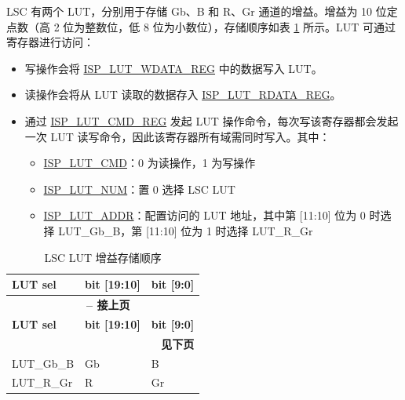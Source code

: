 \documentclass[main\_\_CN.tex]{subfiles}
\begin{document}
LSC 有两个 LUT，分别用于存储 Gb、B 和 R、Gr 通道的增益。增益为 10 位定点数（高 2 位为整数位，低 8 位为小数位），存储顺序如表 \ref{tab:lsc_lut_order} 所示。LUT 可通过寄存器进行访问：
\begin{itemize}
    \item 写操作会将 \hyperref[regdesc:ISPLUTWDATAREG]{ISP\_LUT\_WDATA\_REG} 中的数据写入 LUT。
    \item 读操作会将从 LUT 读取的数据存入 \hyperref[regdesc:ISPLUTRDATAREG]{ISP\_LUT\_RDATA\_REG}。
    \item 通过 \hyperref[regdesc:ISPLUTCMDREG]{ISP\_LUT\_CMD\_REG} 发起 LUT 操作命令，每次写该寄存器都会发起一次 LUT 读写命令，因此该寄存器所有域需同时写入。其中：\\
    \begin{itemize}
        \item \hyperref[fielddesc:ISPLUTCMD]{ISP\_LUT\_CMD}：0 为读操作，1 为写操作\\
        \item \hyperref[fielddesc:ISPLUTNUM]{ISP\_LUT\_NUM}：置 0 选择 LSC LUT\\
        \item \hyperref[fielddesc:ISPLUTADDR]{ISP\_LUT\_ADDR}：配置访问的 LUT 地址，其中第 [11:10] 位为 0 时选择 LUT\_Gb\_B，第 [11:10] 位为 1 时选择 LUT\_R\_Gr
    \end{itemize}
\end{itemize}

\begin{longtable}[c]{ |p{5cm}|p{3cm}|p{3cm}| }
    \caption{LSC LUT 增益存储顺序}
    \label{tab:lsc_lut_order}\\\hline

    \rowcolor{lightgray}
    \textbf{LUT sel} & \textbf{bit [19:10]} & \textbf{bit [9:0]} \\\hline
    \endfirsthead


    \multicolumn{3}{c}{\bfseries \tablename\ \thetable{} -- 接上页}\\\hline
    \rowcolor{lightgray}
    \textbf{LUT sel} & \textbf{bit [19:10]} & \textbf{bit [9:0]} \\\hline
    \endhead

    \multicolumn{3}{r}{\textbf{见下页}} \\
    \endfoot

    \endlastfoot

        LUT\_Gb\_B & Gb & B \\\hline
        LUT\_R\_Gr & R & Gr \\\hline

\end{longtable}
\end{document}
